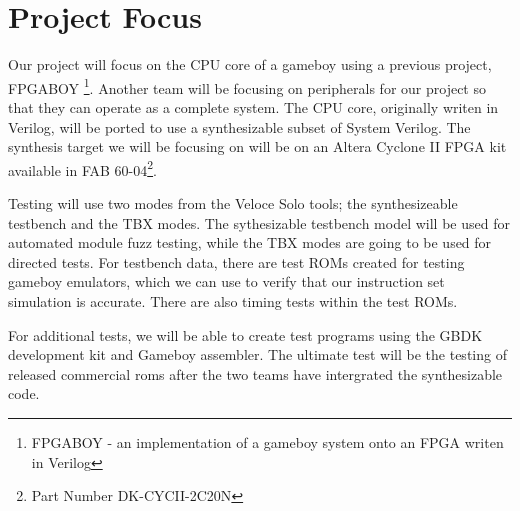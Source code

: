 \section{Project Focus}
Our project will focus on the CPU core of a gameboy using a previous project,
FPGABOY \footnote{FPGABOY - an implementation of a gameboy system onto an FPGA 
writen in Verilog}. Another team will be focusing on peripherals for our project 
so that they can operate as a complete system. The CPU core, originally writen 
in Verilog, will be ported to use a synthesizable subset of System Verilog.
The synthesis target we will be focusing on will be on an Altera Cyclone II 
FPGA kit available in FAB 60-04\footnote{Part Number DK-CYCII-2C20N}.

Testing will use two modes from the Veloce Solo tools; the synthesizeable 
testbench and the TBX modes. The sythesizable testbench model will be used for 
automated module fuzz testing, while the TBX modes are going to be used for 
directed tests. For testbench data, there are test ROMs created 
for testing gameboy emulators, which we can use to verify that our instruction 
set simulation is accurate. There are also timing tests within the test ROMs. 


For additional tests, we will be able to create test programs using the GBDK 
development kit and Gameboy assembler. The ultimate test will be the testing of released commercial roms after the two teams have intergrated the synthesizable code.

